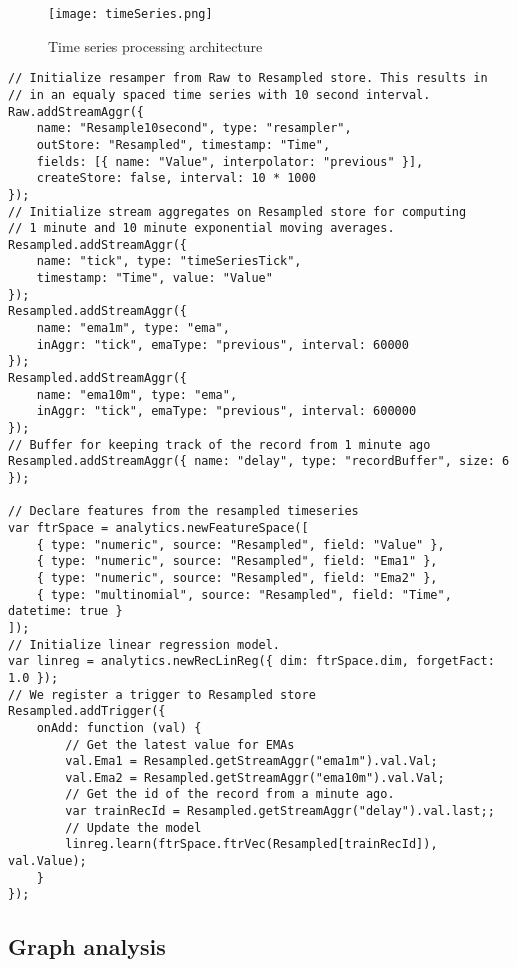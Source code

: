 \documentclass{article} %
\begin{document}
\begin{figure}[h]
\begin{center}
\texttt{[image: timeSeries.png]}
\end{center}
\caption{Time series processing architecture}
\end{figure}

\begin{lstlisting}[caption=Time series processing] 	
// Initialize resamper from Raw to Resampled store. This results in
// in an equaly spaced time series with 10 second interval.
Raw.addStreamAggr({
    name: "Resample10second", type: "resampler",
    outStore: "Resampled", timestamp: "Time",
    fields: [{ name: "Value", interpolator: "previous" }],
    createStore: false, interval: 10 * 1000
});
// Initialize stream aggregates on Resampled store for computing
// 1 minute and 10 minute exponential moving averages.
Resampled.addStreamAggr({
    name: "tick", type: "timeSeriesTick",
    timestamp: "Time", value: "Value"
});
Resampled.addStreamAggr({
    name: "ema1m", type: "ema",
    inAggr: "tick", emaType: "previous", interval: 60000
});
Resampled.addStreamAggr({
    name: "ema10m", type: "ema",
    inAggr: "tick", emaType: "previous", interval: 600000
});
// Buffer for keeping track of the record from 1 minute ago
Resampled.addStreamAggr({ name: "delay", type: "recordBuffer", size: 6 });

// Declare features from the resampled timeseries
var ftrSpace = analytics.newFeatureSpace([
    { type: "numeric", source: "Resampled", field: "Value" },
    { type: "numeric", source: "Resampled", field: "Ema1" },
    { type: "numeric", source: "Resampled", field: "Ema2" },
    { type: "multinomial", source: "Resampled", field: "Time", datetime: true }
]);
// Initialize linear regression model.
var linreg = analytics.newRecLinReg({ dim: ftrSpace.dim, forgetFact: 1.0 });
// We register a trigger to Resampled store
Resampled.addTrigger({
    onAdd: function (val) {
        // Get the latest value for EMAs
        val.Ema1 = Resampled.getStreamAggr("ema1m").val.Val;
        val.Ema2 = Resampled.getStreamAggr("ema10m").val.Val;
        // Get the id of the record from a minute ago.
        var trainRecId = Resampled.getStreamAggr("delay").val.last;;
        // Update the model
        linreg.learn(ftrSpace.ftrVec(Resampled[trainRecId]), val.Value);
    }
});

\end{lstlisting}


\subsection{Graph analysis}
\end{document}
